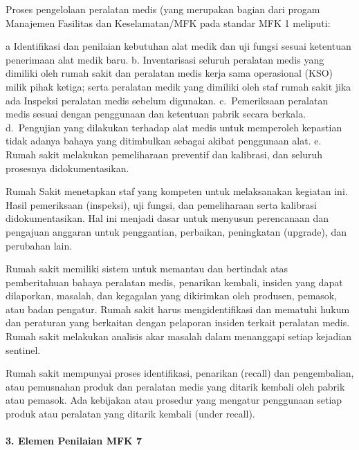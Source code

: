 \documentclass[
]{book}
\begin{document}
Proses pengelolaan peralatan medis (yang merupakan bagian dari progam Manajemen Fasilitas dan Keselamatan/MFK pada standar MFK 1 meliputi:

a Identifikasi dan penilaian kebutuhan alat medik dan uji fungsi sesuai ketentuan penerimaan alat medik baru.
b. Inventarisasi seluruh peralatan medis yang dimiliki oleh rumah sakit dan peralatan medis kerja sama operasional (KSO) milik pihak ketiga; serta peralatan medik yang dimiliki oleh staf rumah sakit jika ada Inspeksi peralatan medis sebelum digunakan.
c.~Pemeriksaan peralatan medis sesuai dengan penggunaan dan ketentuan pabrik secara berkala.
d.~Pengujian yang dilakukan terhadap alat medis untuk memperoleh kepastian tidak adanya bahaya yang ditimbulkan sebagai akibat penggunaan alat.
e. Rumah sakit melakukan pemeliharaan preventif dan kalibrasi, dan seluruh prosesnya didokumentasikan.

Rumah Sakit menetapkan staf yang kompeten untuk melaksanakan kegiatan ini. Hasil pemeriksaan (inspeksi), uji fungsi, dan pemeliharaan serta kalibrasi didokumentasikan. Hal ini menjadi dasar untuk menyusun perencanaan dan pengajuan anggaran untuk penggantian, perbaikan, peningkatan (upgrade), dan perubahan lain.

Rumah sakit memiliki sistem untuk memantau dan bertindak atas pemberitahuan bahaya peralatan medis, penarikan kembali, insiden yang dapat dilaporkan, masalah, dan kegagalan yang dikirimkan oleh produsen, pemasok, atau badan pengatur. Rumah sakit harus mengidentifikasi dan mematuhi hukum dan peraturan yang berkaitan dengan pelaporan insiden terkait peralatan medis. Rumah sakit melakukan analisis akar masalah dalam menanggapi setiap kejadian sentinel.

Rumah sakit mempunyai proses identifikasi, penarikan (recall) dan pengembalian, atau pemusnahan produk dan peralatan medis yang ditarik kembali oleh pabrik atau pemasok. Ada kebijakan atau prosedur yang mengatur penggunaan setiap produk atau peralatan yang ditarik kembali (under recall).

\hypertarget{elemen-penilaian-mfk-7}{%
\paragraph*{3. Elemen Penilaian MFK 7}\label{elemen-penilaian-mfk-7}}
\end{document}
